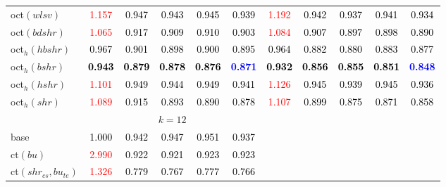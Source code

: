 \begin{tabular}[t]{l|>{}cccc>{}c|ccccc}
oct$(wlsv)$ & \textcolor{red}{1.157} & \textcolor{black}{0.947} & \textcolor{black}{0.943} & \textcolor{black}{0.945} & \textcolor{black}{0.939} & \textcolor{red}{1.192} & \textcolor{black}{0.942} & \textcolor{black}{0.937} & \textcolor{black}{0.941} & \textcolor{black}{0.934}\\
oct$(bdshr)$ & \textcolor{red}{1.065} & \textcolor{black}{0.917} & \textcolor{black}{0.909} & \textcolor{black}{0.910} & \textcolor{black}{0.903} & \textcolor{red}{1.084} & \textcolor{black}{0.907} & \textcolor{black}{0.897} & \textcolor{black}{0.898} & \textcolor{black}{0.890}\\
oct$_h(hbshr)$ & \textcolor{black}{0.967} & \textcolor{black}{0.901} & \textcolor{black}{0.898} & \textcolor{black}{0.900} & \textcolor{black}{0.895} & \textcolor{black}{0.964} & \textcolor{black}{0.882} & \textcolor{black}{0.880} & \textcolor{black}{0.883} & \textcolor{black}{0.877}\\
oct$_h(bshr)$ & \textcolor{black}{\textbf{0.943}} & \textcolor{black}{\textbf{0.879}} & \textcolor{black}{\textbf{0.878}} & \textcolor{black}{\textbf{0.876}} & \textcolor{blue}{\textbf{0.871}} & \textcolor{black}{\textbf{0.932}} & \textcolor{black}{\textbf{0.856}} & \textcolor{black}{\textbf{0.855}} & \textcolor{black}{\textbf{0.851}} & \textcolor{blue}{\textbf{0.848}}\\
oct$_h(hshr)$ & \textcolor{red}{1.101} & \textcolor{black}{0.949} & \textcolor{black}{0.944} & \textcolor{black}{0.949} & \textcolor{black}{0.941} & \textcolor{red}{1.126} & \textcolor{black}{0.945} & \textcolor{black}{0.939} & \textcolor{black}{0.945} & \textcolor{black}{0.936}\\
oct$_h(shr)$ & \textcolor{red}{1.089} & \textcolor{black}{0.915} & \textcolor{black}{0.893} & \textcolor{black}{0.890} & \textcolor{black}{0.878} & \textcolor{red}{1.107} & \textcolor{black}{0.899} & \textcolor{black}{0.875} & \textcolor{black}{0.871} & \textcolor{black}{0.858}\\
\addlinespace[0.3em]
\multicolumn{1}{c}{} & \multicolumn{5}{c}{\textbf{$k = 12$}} & \multicolumn{5}{c}{}\\
base & \textcolor{black}{1.000} & \textcolor{black}{0.942} & \textcolor{black}{0.947} & \textcolor{black}{0.951} & \textcolor{black}{0.937} &  &  &  &  & \\
ct$(bu)$ & \textcolor{red}{2.990} & \textcolor{black}{0.922} & \textcolor{black}{0.921} & \textcolor{black}{0.923} & \textcolor{black}{0.923} &  &  &  &  & \\
ct$(shr_{cs}, bu_{te})$ & \textcolor{red}{1.326} & \textcolor{black}{0.779} & \textcolor{black}{0.767} & \textcolor{black}{0.777} & \textcolor{black}{0.766} &  &  &  &  & \\

\end{tabular}
